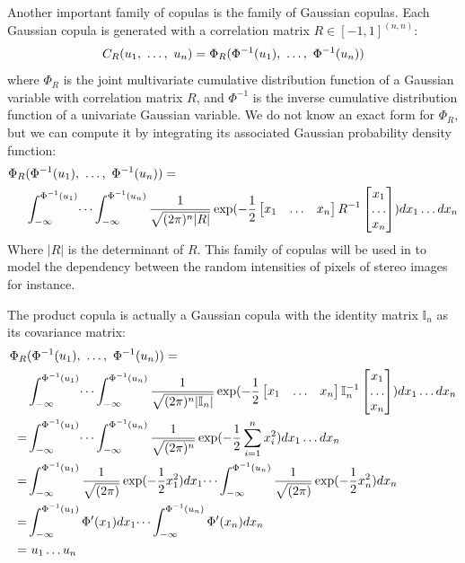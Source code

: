 Another important family of copulas is the family of Gaussian copulas. Each Gaussian copula is generated with a correlation matrix $R\in[-1,1]^{(n,n)}$:
\begin{align}
    C_R(u_1, ~\dots, ~ u_n)=\Phi_R(\Phi^{-1}(u_1), ~\dots, ~ \Phi^{-1}(u_n))
\end{align} where $\Phi_R$ is the joint multivariate cumulative distribution function of a Gaussian variable with correlation matrix $R$, and $\Phi^{-1}$ is the inverse cumulative distribution function of a univariate Gaussian variable. We do not know an exact form for $\Phi_R$, but we can compute it by integrating its associated Gaussian probability density function:
\begin{align}
   \Phi_R&(\Phi^{-1}(u_1), ~\dots, ~ \Phi^{-1}(u_n)) =\nonumber\\ &\int_{-\infty}^{\Phi^{-1}(u_1)}\dots\int_{-\infty}^{\Phi^{-1}(u_n)}\frac{1}{\sqrt{(2\pi)^{n}|R|}}\exp(-\frac{1}{2}\begin{bmatrix}x_1 & \dots & x_{n}\end{bmatrix}R^{-1}\begin{bmatrix}x_1 \\ \dots \\ x_{n}\end{bmatrix})dx_1\dots dx_n
\end{align}
Where $|R|$ is the determinant of $R$. This family of copulas will be used in  to model the dependency between the random intensities of pixels of stereo images for instance. 
\begin{remark}
    The product copula is actually a Gaussian copula with the identity matrix $\mathbb{I}_n$ as its covariance matrix:
    \begin{align*}
        \Phi_R&(\Phi^{-1}(u_1), ~\dots, ~ \Phi^{-1}(u_n)) =\\ &\int_{-\infty}^{\Phi^{-1}(u_1)}\dots\int_{-\infty}^{\Phi^{-1}(u_n)}\frac{1}{\sqrt{(2\pi)^{n}|\mathbb{I}_n|}}\exp(-\frac{1}{2}\begin{bmatrix}x_1 & \dots & x_{n}\end{bmatrix}\mathbb{I}_n^{-1}\begin{bmatrix}x_1 \\ \dots \\ x_{n}\end{bmatrix})dx_1\dots dx_n\\
        =& \int_{-\infty}^{\Phi^{-1}(u_1)}\dots\int_{-\infty}^{\Phi^{-1}(u_n)}\frac{1}{\sqrt{(2\pi)^{n}}}\exp(-\frac{1}{2}\sum_{i=1}^nx_i^2)dx_1\dots dx_n\\
        =& \int_{-\infty}^{\Phi^{-1}(u_1)}\frac{1}{\sqrt{(2\pi)}}\exp(-\frac{1}{2}x_1^2)dx_1\dots\int_{-\infty}^{\Phi^{-1}(u_n)}\frac{1}{\sqrt{(2\pi)}}\exp(-\frac{1}{2}x_n^2)dx_n\\
        =& \int_{-\infty}^{\Phi^{-1}(u_1)}\Phi'(x_1)dx_1\dots\int_{-\infty}^{\Phi^{-1}(u_n)}\Phi'(x_n)dx_n\\
        =& ~u_1\dots u_n
    \end{align*}
\end{remark}

